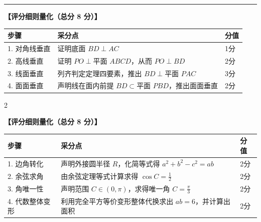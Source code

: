 \documentclass[11pt,a4paper]{ctexart}
\begin{document}
\addvspace{1.0em}
\hrule
\addvspace{1.0em}

{\small \qGeneralExampleTwoStem}

\begingroup\small
\noindent\textbf{【评分细则量化（总分 8 分）】}\par\nopagebreak\addvspace{0.3em}
\begin{tabularx}{\textwidth}{|p{2.5cm}|X|p{1.5cm}|}
\hline
步骤 & 采分点 & 分值 \\ \hline
1. 对角线垂直 & 证明底面 \(BD \perp AC\) & 1分 \\ \hline
2. 高线垂直 & 证明 \(PO \perp \text{平面 } ABCD\)，从而 \(PO \perp BD\) & 2分 \\ \hline
3. 线面垂直 & 列齐判定定理四要素，推出 \(BD \perp \text{平面 } PAC\) & 3分 \\ \hline
4. 面面垂直 & 声明线在面内前提 \(BD \subset \text{平面 } PBD\)，推出面面垂直 & 2分 \\ \hline
\end{tabularx}
\endgroup

\begin{paracol}{2}

\switchcolumn
{}
\end{paracol}

\newpage

{\small \qGeneralExampleThreeStem}

\begingroup\small
\noindent\textbf{【评分细则量化（总分 8 分）】}\par\nopagebreak\addvspace{0.3em}
\begin{tabularx}{\textwidth}{|p{2.5cm}|X|p{1.5cm}|}
\hline
步骤 & 采分点 & 分值 \\ \hline
1. 边角转化 & 声明外接圆半径 \(R\)，化简等式得 \(a^2 + b^2 - c^2 = ab\) & 2分 \\ \hline
2. 余弦求角 & 由余弦定理等式计算求得 \(\cos C = \frac{1}{2}\) & 2分 \\ \hline
3. 角唯一性 & 声明范围 \(C \in (0, \pi)\)，求得唯一角 \(C = \frac{\pi}{3}\) & 2分 \\ \hline
4. 代数整体变形 & 利用完全平方等价变形整体代换求出 \(ab = 6\)，并计算出面积 & 2分 \\ \hline
\end{tabularx}
\endgroup
\end{document}
